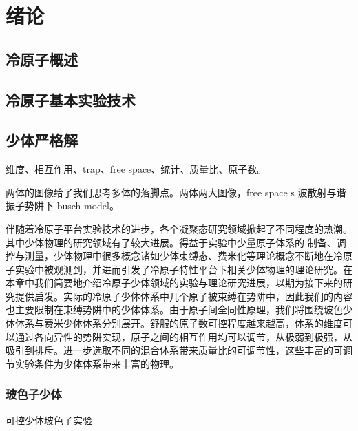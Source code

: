 \chapter{绪论}\label{chap:kondo}

\section{冷原子概述}

\section{冷原子基本实验技术}

\section{少体严格解}\label{sec:fewbody}

维度、相互作用、trap、free space、统计、质量比、原子数。

两体的图像给了我们思考多体的落脚点。两体两大图像，free space s 波散射与谐振子势阱下 busch model。

伴随着冷原子平台实验技术的进步，各个凝聚态研究领域掀起了不同程度的热潮。其中少体物理的研究领域有了较大进展。得益于实验中少量原子体系的
制备、调控与测量，少体物理中很多概念诸如少体束缚态、费米化等理论概念不断地在冷原子实验中被观测到，并进而引发了冷原子特性平台下相关少体物理的理论研究。在本章中我们简要地介绍冷原子少体领域的实验与理论研究进展，以期为接下来的研究提供启发。实际的冷原子少体体系中几个原子被束缚在势阱中，因此我们的内容也主要限制在束缚势阱中的少体体系。由于原子间全同性原理，我们将围绕玻色少体体系与费米少体体系分别展开。舒服的原子数可控程度越来越高，体系的维度可以通过各向异性的势阱实现，原子之间的相互作用均可以调节，从极弱到极强，从吸引到排斥。进一步选取不同的混合体系带来质量比的可调节性，这些丰富的可调节实验条件为少体体系带来丰富的物理。


\subsection{玻色子少体}

可控少体玻色子实验


